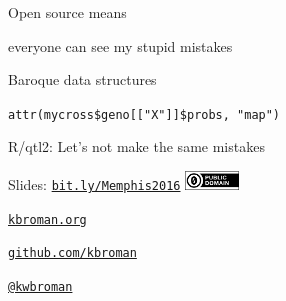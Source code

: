 \documentclass[12pt,t]{beamer}
\begin{document}
\begin{frame}[c]{}

  \large

  {\hilit Open source} {\lolit means}

  everyone can see my stupid mistakes

  \bigskip \bigskip \bigskip


\end{frame}


\begin{frame}[c]{Baroque data structures}

  \large
      {\tt attr(mycross\$geno[["X"]]\$probs, "map")}

\end{frame}



\begin{frame}[c]{R/qtl2: Let's not make the same mistakes}

  \bbi
{}
\ei

\end{frame}





\begin{frame}[c]{}

\Large

Slides: \href{http://bit.ly/Memphis2016}{\tt bit.ly/Memphis2016} \quad
\includegraphics[height=5mm]{Figs/cc-zero.png}

\vspace{10mm}

\href{http://kbroman.org}{\tt kbroman.org}

\vspace{10mm}

\href{https://github.com/kbroman}{\tt github.com/kbroman}

\vspace{10mm}

\href{https://twitter.com/kwbroman}{\tt @kwbroman}


\end{frame}
\end{document}
